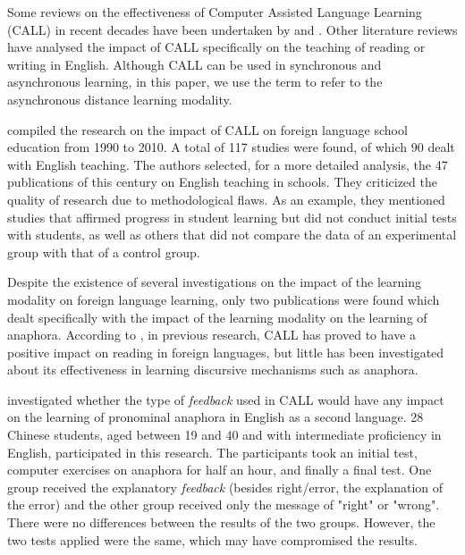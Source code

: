 \documentclass{textolivre}
\begin{document}
Some reviews on the effectiveness of Computer Assisted Language Learning
(CALL) in recent decades have been undertaken by \textcite{stockwell_review_2007}  %
and \textcite{liu_look_2002}. Other literature reviews have
analysed the impact of CALL specifically on the teaching of reading
\cite{kim_use_2002} or writing \cite{yang_review_2012} in English. Although
CALL can be used in synchronous and asynchronous learning, in this
paper, we use the term to refer to the asynchronous distance learning
modality.

\textcite{macaro_systematic_2012} compiled the research on the impact
of CALL on foreign language school education from 1990 to 2010. A total
of 117 studies were found, of which 90 dealt with English teaching. The
authors selected, for a more detailed analysis, the 47 publications of
this century on English teaching in schools. They criticized the quality
of research due to methodological flaws. As an example, they mentioned
studies that affirmed progress in student learning but did not conduct
initial tests with students, as well as others that did not compare the
data of an experimental group with that of a control group.

Despite the existence of several investigations on the impact of the
learning modality on foreign language learning, only two publications
were found which dealt specifically with the impact of the learning
modality on the learning of anaphora. According to \textcite[p.~72]{li_engaging_2014}, in
previous research, CALL has proved to have a positive impact on reading
in foreign languages, but little has been investigated about its
effectiveness in learning discursive mechanisms such as anaphora.

\textcite{liu_acquisition_2010} investigated whether the type of \emph{feedback} used in CALL
would have any impact on the learning of pronominal anaphora in English
as a second language. 28 Chinese students, aged between 19 and 40 and
with intermediate proficiency in English, participated in this research.
The participants took an initial test, computer exercises on anaphora
for half an hour, and finally a final test. One group received the
explanatory \emph{feedback} (besides right/error, the explanation of the
error) and the other group received only the message of "right" or
"wrong". There were no differences between the results of the two
groups. However, the two tests applied were the same, which may have
compromised the results.
\end{document}

